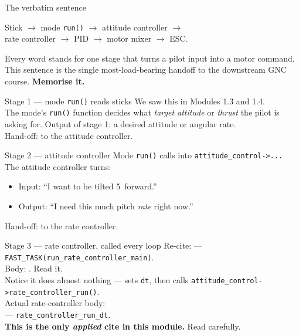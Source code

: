 \documentclass[aspectratio=169,11pt]{beamer}
\begin{document}
\begin{frame}{The verbatim sentence}
  \begin{center}\Large
    Stick $\rightarrow$ mode \texttt{run()} $\rightarrow$ attitude controller $\rightarrow$\\[0.3ex]
    rate controller $\rightarrow$ PID $\rightarrow$ motor mixer $\rightarrow$ ESC.
  \end{center}
  \vfill
  Every word stands for one stage that turns a pilot input into a motor command.\\[1ex]
  This sentence is the single most-load-bearing handoff to the downstream GNC course. \textbf{Memorise it.}
\end{frame}

\begin{frame}{Stage 1 --- mode \texttt{run()} reads sticks}
  We saw this in Modules 1.3 and 1.4.\\[1ex]
  The mode's \texttt{run()} function decides what \emph{target attitude} or \emph{thrust} the pilot is asking for.
  \vfill
  Output of stage 1: a desired attitude or angular rate.\\
  Hand-off: to the attitude controller.
\end{frame}

\begin{frame}{Stage 2 --- attitude controller}
  Mode \texttt{run()} calls into \texttt{attitude\_control->...}\\[1ex]
  The attitude controller turns:
  \begin{itemize}
    \item Input: ``I want to be tilted 5\textdegree\ forward.''
    \item Output: ``I need this much pitch \emph{rate} right now.''
  \end{itemize}
  \vfill
  Hand-off: to the rate controller.
\end{frame}

\begin{frame}{Stage 3 --- rate controller, called every loop}
  Re-cite:  --- \texttt{FAST\_TASK(run\_rate\_controller\_main)}.\\[1ex]
  Body: . Read it.\\
  Notice it does almost nothing --- sets \texttt{dt}, then calls \texttt{attitude\_control->rate\_controller\_run()}.\\[1ex]
  Actual rate-controller body:\\
   --- \texttt{rate\_controller\_run\_dt}.\\[1ex]
  \textbf{This is the only \emph{applied} cite in this module.} Read carefully.
\end{frame}
\end{document}
